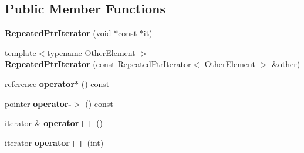 \subsection*{Public Member Functions}
\begin{DoxyCompactItemize}
\item 
\mbox{\label{classgoogle_1_1protobuf_1_1internal_1_1RepeatedPtrIterator_aef704a89a0af1bd57898c5d06d035db2}} 
{\bfseries Repeated\+Ptr\+Iterator} (void $\ast$const $\ast$it)
\item 
\mbox{\label{classgoogle_1_1protobuf_1_1internal_1_1RepeatedPtrIterator_adb14d8a077fadccd065046f88b807db5}} 
{\footnotesize template$<$typename Other\+Element $>$ }\\{\bfseries Repeated\+Ptr\+Iterator} (const \hyperlink{classgoogle_1_1protobuf_1_1internal_1_1RepeatedPtrIterator}{Repeated\+Ptr\+Iterator}$<$ Other\+Element $>$ \&other)
\item 
\mbox{\label{classgoogle_1_1protobuf_1_1internal_1_1RepeatedPtrIterator_a2fcbbedbb5c197d48ee65e2e8e176480}} 
reference {\bfseries operator$\ast$} () const
\item 
\mbox{\label{classgoogle_1_1protobuf_1_1internal_1_1RepeatedPtrIterator_adcae0adea718a769086bb054b999cd23}} 
pointer {\bfseries operator-\/$>$} () const
\item 
\mbox{\label{classgoogle_1_1protobuf_1_1internal_1_1RepeatedPtrIterator_a10561436155f9bb10c42db002d334809}} 
\hyperlink{classgoogle_1_1protobuf_1_1internal_1_1RepeatedPtrIterator}{iterator} \& {\bfseries operator++} ()
\item 
\mbox{\label{classgoogle_1_1protobuf_1_1internal_1_1RepeatedPtrIterator_a4869f19f511f22a1d5b7a489b9794ad8}} 
\hyperlink{classgoogle_1_1protobuf_1_1internal_1_1RepeatedPtrIterator}{iterator} {\bfseries operator++} (int)
\item 
\mbox{\label{classgoogle_1_1protobuf_1_1internal_1_1RepeatedPtrIterator_ab82c44da3a432ec80f5a6a5c5bb8e6b6}} 

\end{DoxyCompactItemize}
